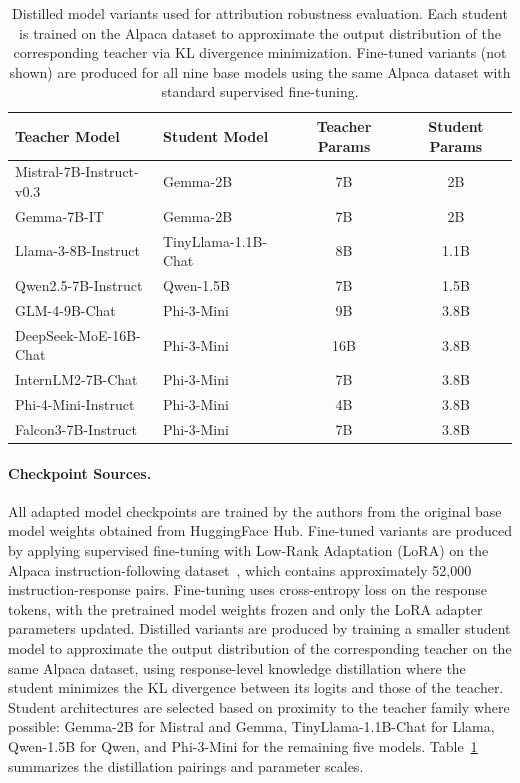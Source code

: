 \begin{table}[!htbp]
\centering
\small
\begin{tabular}{llcc}
\toprule
\textbf{Teacher Model} & \textbf{Student Model} & \textbf{Teacher Params} & \textbf{Student Params} \\
\midrule
Mistral-7B-Instruct-v0.3  & Gemma-2B          & 7B  & 2B   \\
Gemma-7B-IT               & Gemma-2B          & 7B  & 2B   \\
Llama-3-8B-Instruct       & TinyLlama-1.1B-Chat & 8B  & 1.1B \\
Qwen2.5-7B-Instruct       & Qwen-1.5B         & 7B  & 1.5B \\
GLM-4-9B-Chat             & Phi-3-Mini        & 9B  & 3.8B \\
DeepSeek-MoE-16B-Chat     & Phi-3-Mini        & 16B & 3.8B \\
InternLM2-7B-Chat         & Phi-3-Mini        & 7B  & 3.8B \\
Phi-4-Mini-Instruct       & Phi-3-Mini        & 4B  & 3.8B \\
Falcon3-7B-Instruct       & Phi-3-Mini        & 7B  & 3.8B \\
\bottomrule
\end{tabular}
\vspace{0.4em}
\caption{Distilled model variants used for attribution robustness evaluation. Each student is trained on the Alpaca dataset to approximate the output distribution of the corresponding teacher via KL divergence minimization. Fine-tuned variants (not shown) are produced for all nine base models using the same Alpaca dataset with standard supervised fine-tuning.}
\label{tab:model_variants}
\vspace{-1.0em}
\end{table}

\paragraph{Checkpoint Sources.}
All adapted model checkpoints are trained by the authors from the original base model weights obtained from HuggingFace Hub. 
Fine-tuned variants are produced by applying supervised fine-tuning with Low-Rank Adaptation (LoRA) on the Alpaca instruction-following dataset~\cite{alpaca}, which contains approximately 52,000 instruction-response pairs. Fine-tuning uses cross-entropy loss on the response tokens, with the pretrained model weights frozen and only the LoRA adapter parameters updated. 
Distilled variants are produced by training a smaller student model to approximate the output distribution of the corresponding teacher on the same Alpaca dataset, using response-level knowledge distillation where the student minimizes the KL divergence between its logits and those of the teacher. Student architectures are selected based on proximity to the teacher family where possible: Gemma-2B for Mistral and Gemma, TinyLlama-1.1B-Chat for Llama, Qwen-1.5B for Qwen, and Phi-3-Mini for the remaining five models. Table~\ref{tab:model_variants} summarizes the distillation pairings and parameter scales.

